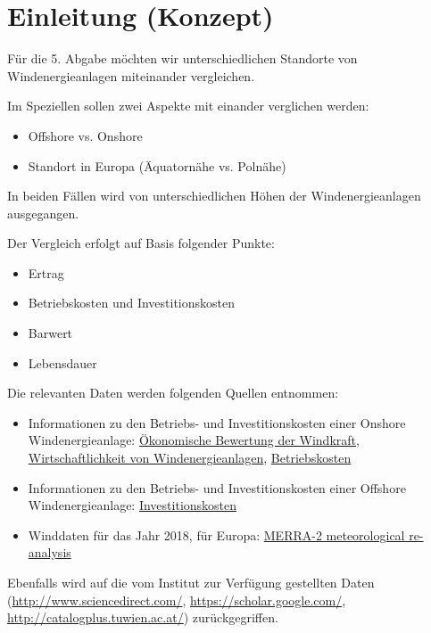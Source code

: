 \documentclass[a4paper,12pt]{article}
\begin{document}
	

	\newpage
	\tableofcontents

	\newpage
	
	\section{Einleitung (Konzept)}
	Für die 5. Abgabe möchten wir unterschiedlichen Standorte von Windenergieanlagen miteinander vergleichen.\\ \par
	\noindent Im Speziellen sollen zwei Aspekte mit einander verglichen werden:
	\begin{itemize}
		\item Offshore vs. Onshore
		\item Standort in Europa (Äquatornähe vs. Polnähe)
	\end{itemize}
	In beiden Fällen wird von unterschiedlichen Höhen der Windenergieanlagen ausgegangen.\\ \par
	\noindent Der Vergleich erfolgt auf Basis folgender Punkte:
	\begin{itemize}
		\item Ertrag
		\item Betriebskosten und Investitionskosten
		\item Barwert
		\item Lebensdauer
	\end{itemize}
	Die relevanten Daten werden folgenden Quellen entnommen:
	\begin{itemize}
		\item Informationen zu den Betriebs- und Investitionskosten einer Onshore Windenergieanlage: \href{https://www.diplomarbeitsboerse.info/wp-content/uploads/%C3%96konomische-Bewertung-der-Windkraft_Bsp-Gro%C3%9Fhofen.pdf}{Ökonomische Bewertung der Windkraft}, 
		\href{https://elite.tugraz.at/Jungbauer/6.htm}{Wirtschaftlichkeit von Windenergieanlagen},  \href{http://windmonitor.iee.fraunhofer.de/windmonitor_de/3_Onshore/5_betriebsergebnisse/4_betriebskosten/}{Betriebskosten}
		\item Informationen zu den Betriebs- und Investitionskosten einer Offshore Windenergieanlage:
		\href{http://windmonitor.iee.fraunhofer.de/windmonitor_de/4_Offshore/5_betriebsergebnisse/4_Investitionskosten/}{Investitionskosten}
		\item Winddaten für das Jahr 2018, für Europa:
		\href{http://www.soda-pro.com/web-services/meteo-data/merra}{MERRA-2 meteorological re-analysis}
	\end{itemize}
	Ebenfalls wird auf die vom Institut zur Verfügung gestellten Daten (\href{http://www.sciencedirect.com/}{http://www.sciencedirect.com/}, \href{https://scholar.google.com/}{https://scholar.google.com/}, \href{http://catalogplus.tuwien.ac.at/}{http://catalogplus.tuwien.ac.at/}) zurückgegriffen.
	
\end{document}
